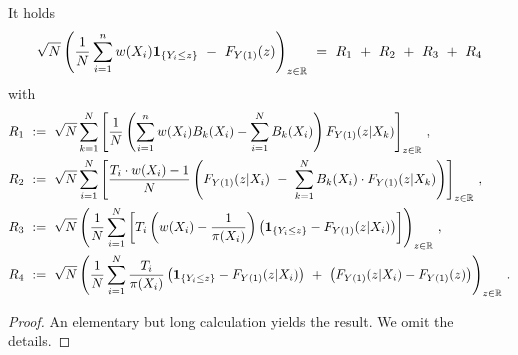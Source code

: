 \begin{lemma}
  \label{aa:mean:lemma_decomp}
  It holds
  \begin{gather}
  \sqrt{N}
\left( 
    \frac{1}{N}
    \sum_{i=1}^{n} 
    w(X_i)
    \mathbf{1}_{\left\{ Y_i \le z \right\}}
    \ 
    -
    \ 
    F_{Y(1)}(z)
    \right)
    _{z\in\R}
    \ 
    =
    \ 
    R_1
    \ 
    +
    \ 
    R_2
    \ 
    +
    \ 
    R_3
    \ 
    +
    \ 
    R_4
  \end{gather}
  with
\begin{align*}
  R_1
  &
  \ 
  :=
  \ 
  \sqrt{N}
  \sum_{k=1}^{N} 
  \left[ 
  \frac{1}{N}
  \left( 
    \sum_{i=1}^{n} 
    w(X_i)
    B_k(X_i)
    -
    \sum_{i=1}^{N} 
    B_k(X_i)
  \right)
  F_{Y(1)}(z|X_k)
  \right]
  _{z\in\R}
  \,,
  \\
  R_2
  &
  \
  :=
  \ 
  \sqrt{N}
    \sum_{i=1}^{N} 
    \left[ 
  \frac{
    T_i\cdot w(X_i) -1 }{N}
    \left( 
  F_{Y(1)}(z|X_i)
    \ 
    -
    \ 
    \sum_{k=1}^{N} 
    B_k(X_i)
    \cdot
  F_{Y(1)}(z|X_k)
    \right)
    \right]
  _{z\in\R}
  \,,
  \\
  R_3
  &
  \
  :=
  \ 
  \sqrt{N}
  \left( 
  \frac{1}{N}
    \sum_{i=1}^{N} 
    \left[ 
    T_i
    \left( 
    w(X_i) 
    -
    \frac{1}{\pi(X_i)}
    \right)
    \left( 
    \mathbf{1}_{\left\{ Y_i \le z \right\}}
    -
  F_{Y(1)}(z|X_i)
    \right)
    \right]
  \right)
  _{z\in\R}
  \,,
  \\
  R_4
  &
  \
  :=
  \ 
  \sqrt{N}
  \left( 
  \frac{1}{N}
    \sum_{i=1}^{N} 
    \frac{T_i}{\pi(X_i)}
    \left( 
    \mathbf{1}_{\left\{ Y_i \le z \right\}}
    -
  F_{Y(1)}(z|X_i)
    \right)
    \ 
    +
    \ 
    \left( 
  F_{Y(1)}(z|X_i)
    -
  F_{Y(1)}(z)
    \right)
  \right)
  _{z\in\R}
  \,.
  \end{align*}

\end{lemma}
\begin{proof}
  An elementary but long calculation yields the result. We omit the details.
\end{proof}

